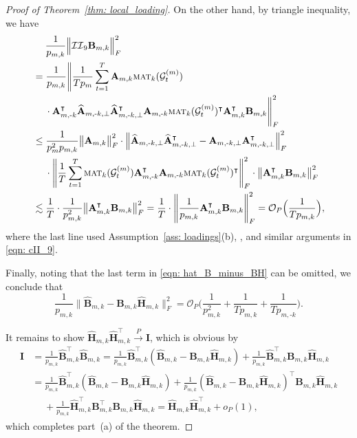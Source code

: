 \documentclass[aos]{imsart}
\theoremstyle{plain}
\theoremstyle{definition}
\def\mat{\textnormal{\textsc{mat}}}
\def\wh#1{\widehat{#1}}
\def\cG{\mathcal{G}} \def\cH{\boldsymbol{\mathcal{H}}} \def\cI{\mathcal{I}}
\def\cII{\mathcal{II}}
\def\cO{\mathcal{O}}
\def\bI{\mathbf{I}}
\def\bA{\mathbf{A}}
\def\bB{\mathbf{B}}
\def\bH{\mathbf{H}}
\def\trans{\intercal}
\begin{document}
\begin{proof}[Proof of Theorem~\ref{thm: local_loading}]
On the other hand, by triangle inequality, we have
\begin{align*}
    &\;\quad
    \frac{1}{p_{m,k}} \Big\| \cII_9 \bB_{m,k} \Big\|_F^2 \\
    &=
    \frac{1}{p_{m,k}} \Bigg\| \frac{1}{Tp_m} \sum_{t=1}^T \bA_{m,k} \mat_k(\cG_t^{(m)}) \\
    &\;\quad
    \cdot \bA_{m,\text{-}k}^\trans \wh{\bA}_{m,\text{-}k,\perp} \wh{\bA}_{m,\text{-}k,\perp}^\trans \bA_{m,\text{-}k} \mat_k(\cG_t^{(m)})^\trans \bA_{m,k}^\trans \bB_{m,k} \Bigg\|_F^2 \\
    &\leq
    \frac{1}{p_m^2 p_{m,k}} \big\|\bA_{m,k}\big\|_F^2 \cdot \Big\| \wh{\bA}_{m,\text{-}k,\perp} \wh{\bA}_{m,\text{-}k,\perp}^\trans - \bA_{m,\text{-}k,\perp} \bA_{m,\text{-}k,\perp}^\trans \Big\|_F^2 \\
    &\;\quad
    \cdot \Bigg\| \frac{1}{T} \sum_{t=1}^T \mat_k(\cG_t^{(m)}) \bA_{m,\text{-}k}^\trans \bA_{m,\text{-}k} \mat_k(\cG_t^{(m)})^\trans \Bigg\|_F^2 \cdot \big\| \bA_{m,k}^\trans \bB_{m,k} \big\|_F^2 \\
    &\lesssim
    \frac{1}{T} \cdot \frac{1}{p_{m,k}^2} \big\| \bA_{m,k}^\trans \bB_{m,k} \big\|_F^2
    = \frac{1}{T} \cdot \Bigg\| \frac{1}{p_{m,k}} \bA_{m,k}^\trans \bB_{m,k} \Bigg\|_F^2
    = \cO_P\Big( \frac{1}{T p_{m,k}} \Big) ,
\end{align*}
where the last line used Assumption~\ref{ass: loadings}(b), , and similar arguments in \eqref{eqn: cII_9}.


Finally, noting that the last term in \eqref{eqn: hat_B_minus_BH} can be omitted, we conclude that
\[
\frac{1}{p_{m,k}} \Big\| \wh{\bB}_{m,k} - \bB_{m,k} \wh{\bH}_{m,k} \Big\|_F^2 = \cO_P\Big( \frac{1}{p_{m,k}^2} + \frac{1}{T p_{m,k}} + \frac{1}{T p_{m,\text{-}k}} \Big) .
\]

It remains to show $\wh{\bH}_{m,k} \wh{\bH}_{m,k}^\trans \xrightarrow{P} \bI$, which is obvious by
\begin{align*}
    \bI &= \frac{1}{p_{m,k}} \wh{\bB}_{m,k}^\trans \wh{\bB}_{m,k} = \frac{1}{p_{m,k}} \wh{\bB}_{m,k}^\trans (\wh{\bB}_{m,k} - \bB_{m,k} \wh{\bH}_{m,k}) + \frac{1}{p_{m,k}} \wh{\bB}_{m,k}^\trans \bB_{m,k} \wh{\bH}_{m,k} \\
    &=
    \frac{1}{p_{m,k}} \wh{\bB}_{m,k}^\trans (\wh{\bB}_{m,k} - \bB_{m,k} \wh{\bH}_{m,k}) + \frac{1}{p_{m,k}} (\wh{\bB}_{m,k} - \bB_{m,k} \wh{\bH}_{m,k})^\trans \bB_{m,k} \wh{\bH}_{m,k} \\
    &\;\quad
    + \frac{1}{p_{m,k}} \wh{\bH}_{m,k}^\trans \bB_{m,k}^\trans \bB_{m,k} \wh{\bH}_{m,k}
    =
    \wh{\bH}_{m,k} \wh{\bH}_{m,k}^\trans + o_P(1) ,
\end{align*}
which completes part~(a) of the theorem.



\end{proof}
\end{document}
